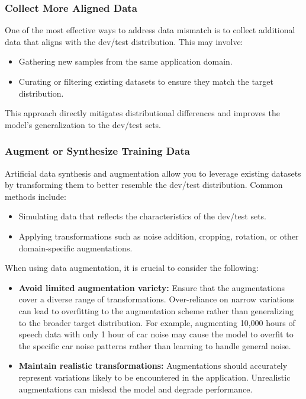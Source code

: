 \documentclass[12pt,openany, draft]{book}
\begin{document}
\subsubsection{Collect More Aligned Data}

One of the most effective ways to address data mismatch is to collect additional data that aligns with the dev/test distribution. This may involve:
\begin{itemize}
    \item Gathering new samples from the same application domain.
    \item Curating or filtering existing datasets to ensure they match the target distribution.
\end{itemize}
This approach directly mitigates distributional differences and improves the model’s generalization to the dev/test sets.

\subsubsection{Augment or Synthesize Training Data}

Artificial data synthesis and augmentation allow you to leverage existing datasets by transforming them to better resemble the dev/test distribution. Common methods include:
\begin{itemize}
    \item Simulating data that reflects the characteristics of the dev/test sets.
    \item Applying transformations such as noise addition, cropping, rotation, or other domain-specific augmentations.
\end{itemize}

When using data augmentation, it is crucial to consider the following:
\begin{itemize}
    \item \textbf{Avoid limited augmentation variety:} Ensure that the augmentations cover a diverse range of transformations. Over-reliance on narrow variations can lead to overfitting to the augmentation scheme rather than generalizing to the broader target distribution. For example, augmenting 10,000 hours of speech data with only 1 hour of car noise may cause the model to overfit to the specific car noise patterns rather than learning to handle general noise.
    \item \textbf{Maintain realistic transformations:} Augmentations should accurately represent variations likely to be encountered in the application. Unrealistic augmentations can mislead the model and degrade performance.
\end{itemize}
\end{document}
